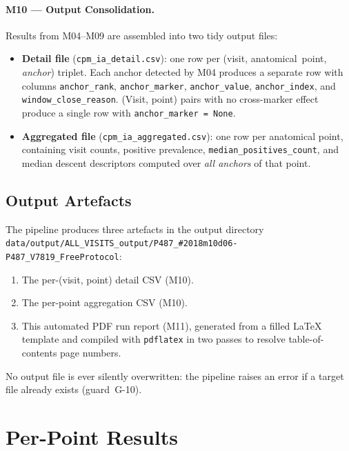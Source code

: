 \documentclass[a4paper,11pt]{article}
\begin{document}
\paragraph{M10 --- Output Consolidation.}
Results from M04--M09 are assembled into two tidy output files:
\begin{itemize}
  \item \textbf{Detail file} (\texttt{cpm\_ia\_detail.csv}): one row per
        (visit, anatomical~point, \emph{anchor}) triplet. Each anchor detected by M04
        produces a separate row with columns \texttt{anchor\_rank},
        \texttt{anchor\_marker}, \texttt{anchor\_value}, \texttt{anchor\_index},
        and \texttt{window\_close\_reason}.
        (Visit, point) pairs with no cross-marker effect produce a single row with
        \texttt{anchor\_marker = None}.
  \item \textbf{Aggregated file} (\texttt{cpm\_ia\_aggregated.csv}): one row per
        anatomical point, containing visit counts, positive prevalence,
        \texttt{median\_positives\_count}, and median descent descriptors computed over
        \emph{all anchors} of that point.
\end{itemize}

\subsection{Output Artefacts}

The pipeline produces three artefacts in the output directory \texttt{data/output/ALL\_VISITS\_output/P487\_\#2018m10d06-P487\_V7819\_FreeProtocol}:
\begin{enumerate}
  \item The per-(visit, point) detail CSV (M10).
  \item The per-point aggregation CSV (M10).
  \item This automated PDF run report (M11), generated from a filled \LaTeX{} template
        and compiled with \texttt{pdflatex} in two passes to resolve table-of-contents
        page numbers.
\end{enumerate}
No output file is ever silently overwritten: the pipeline raises an error if a target
file already exists (guard~G-10).

\section{Per-Point Results}
\end{document}
